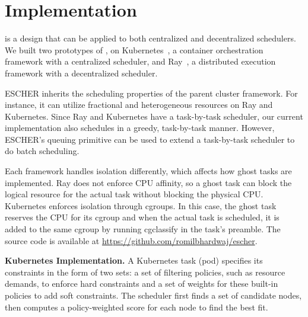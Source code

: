 \section{Implementation}
\label{sec:impl}
\name{} is a design that can be applied to both centralized and decentralized schedulers.
We built two prototypes of \name{}, on Kubernetes~\cite{kubernetes}, a container orchestration framework with a centralized scheduler, and Ray~\cite{ray-osdi}, a distributed execution framework with a decentralized scheduler.

ESCHER inherits the scheduling properties of the parent cluster framework. For instance, it can utilize fractional and heterogeneous resources on Ray and Kubernetes. Since Ray and Kubernetes have a task-by-task scheduler, our current implementation also schedules in a greedy, task-by-task manner. However, ESCHER's queuing primitive can be used to extend a task-by-task scheduler to do batch scheduling.

Each framework handles isolation differently, which affects how ghost tasks are implemented. Ray does not enforce CPU affinity, so a ghost task can block the logical resource for the actual task without blocking the physical CPU. Kubernetes enforces isolation through cgroups. In this case, the ghost task reserves the CPU for its cgroup and when the actual task is scheduled, it is added to the same cgroup by running cgclassify in the task's preamble.
The source code is available at \href{https://github.com/romilbhardwaj/escher}{https://github.com/romilbhardwaj/escher}.

\noindent\textbf{Kubernetes Implementation.}
A Kubernetes task (pod) specifies its constraints in the form of two sets: a set of filtering policies, such as resource demands, to enforce hard constraints and a set of weights for these built-in policies to add soft constraints.
The scheduler first finds a set of candidate nodes, then computes a policy-weighted score for each node to find the best fit.

